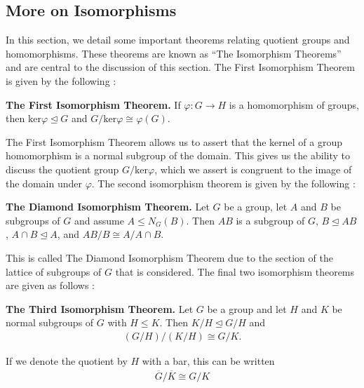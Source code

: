 \documentclass[11pt, reqno]{amsart}
\theoremstyle{plain}
\theoremstyle{definition}
\theoremstyle{example}
\def\normeq{\unlhd}
\begin{document}
\subsection{More on Isomorphisms}

In this section, we detail some important theorems relating quotient groups and homomorphisms. These theorems are known as ``The Isomorphism Theorems'' and are central to the discussion of this section. The First Isomorphism Theorem is given by the following \cite[\S 3.3, p. 97]{dummit}:

\textbf{The First Isomorphism Theorem.} If $\varphi: G \to H$ is a homomorphism of groups, then $\text{ker} \varphi \normeq G$ and $G/\text{ker}\varphi \cong \varphi(G)$.

\par
The First Isomorphism Theorem allows us to assert that the kernel of a group homomorphism is a normal subgroup of the domain. This gives us the ability to discuss the quotient group $G/\text{ker}\varphi$, which we assert is congruent to the image of the domain under $\varphi$. The second isomorphism theorem is given by the following \cite[\S 3.3, p. 97]{dummit}:

\textbf{The Diamond Isomorphism Theorem.} Let $G$ be a group, let $A$ and $B$ be subgroups of $G$ and assume $A \leq N_G(B)$. Then $AB$ is a subgroup of $G$, $B \normeq AB$, $A \cap B \normeq A$, and $AB/B \cong A/A \cap B$.

\par
This is called The Diamond Isomorphism Theorem due to the section of the lattice of subgroups of $G$ that is considered. The final two isomorphism theorems are given as follows \cite[\S 3.3, p. 98-99]{dummit}:

\textbf{The Third Isomorphism Theorem.} Let $G$ be a group and let $H$ and $K$ be normal subgroups of $G$ with $H \leq K$. Then $K/H \normeq G/H$ and 
\begin{align*}
(G/H)/(K/H) \cong G/K.
\end{align*}

If we denote the quotient by $H$ with a bar, this can be written
\begin{align*}
\overline{G}/\overline{K} \cong G/K
\end{align*}
\end{document}
